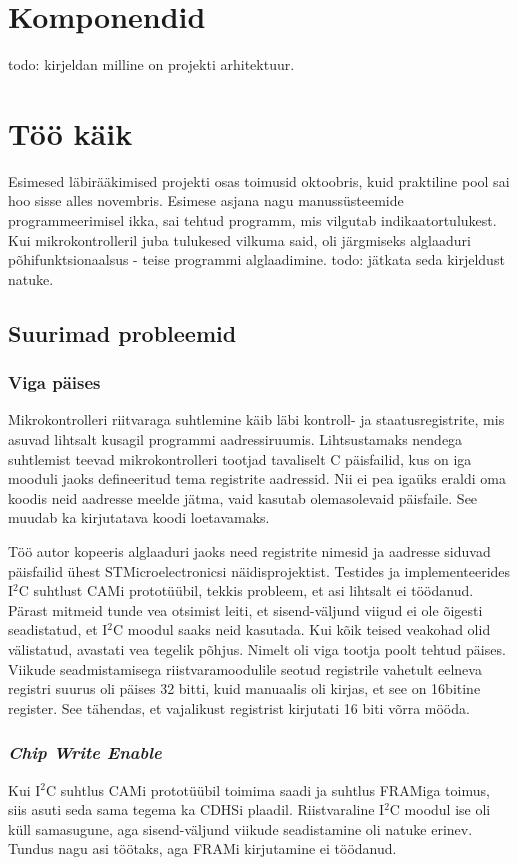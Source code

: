 \documentclass[12pt,a4paper]{article}
\newcommand{\iic}{I\({}^2\)C }
\begin{document}
\section{Komponendid}
todo: kirjeldan milline on projekti arhitektuur.

\section{Töö käik}
Esimesed läbirääkimised projekti osas toimusid oktoobris, kuid praktiline pool
sai hoo sisse alles novembris. Esimese asjana nagu manussüsteemide
programmeerimisel ikka, sai tehtud programm, mis vilgutab indikaatortulukest.
Kui mikrokontrolleril juba tulukesed vilkuma said, oli järgmiseks alglaaduri
põhifunktsionaalsus - teise programmi alglaadimine. todo: jätkata seda kirjeldust
natuke.

\subsection{Suurimad probleemid}
\subsubsection{Viga päises}
Mikrokontrolleri riitvaraga suhtlemine käib läbi kontroll- ja staatusregistrite,
mis asuvad lihtsalt kusagil programmi aadressiruumis. Lihtsustamaks nendega
suhtlemist teevad mikrokontrolleri tootjad tavaliselt C päisfailid, kus on iga
mooduli jaoks defineeritud tema registrite aadressid. Nii ei pea igaüks eraldi
oma koodis neid aadresse meelde jätma, vaid kasutab olemasolevaid päisfaile. See
muudab ka kirjutatava koodi loetavamaks.

Töö autor kopeeris alglaaduri jaoks need registrite nimesid ja aadresse siduvad
päisfailid ühest STMicroelectronicsi näidisprojektist. Testides ja
implementeerides \iic suhtlust CAMi prototüübil, tekkis probleem, et asi
lihtsalt ei töödanud. Pärast mitmeid tunde vea otsimist leiti, et
sisend-väljund viigud ei ole õigesti seadistatud, et \iic moodul saaks neid
kasutada. Kui kõik teised veakohad olid välistatud, avastati vea tegelik põhjus.
Nimelt oli viga tootja poolt tehtud päises. Viikude seadmistamisega
riistvaramoodulile seotud registrile vahetult eelneva registri suurus oli päises
32 bitti, kuid manuaalis oli kirjas, et see on 16bitine register. See tähendas,
et vajalikust registrist kirjutati 16 biti võrra mööda. 
\subsubsection{\textit{Chip Write Enable}}
Kui \iic suhtlus CAMi prototüübil toimima saadi ja suhtlus FRAMiga toimus, siis
asuti seda sama tegema ka CDHSi plaadil. Riistvaraline \iic moodul ise oli küll
samasugune, aga sisend-väljund viikude seadistamine oli natuke erinev. Tundus
nagu asi töötaks, aga FRAMi kirjutamine ei töödanud.
\end{document}
